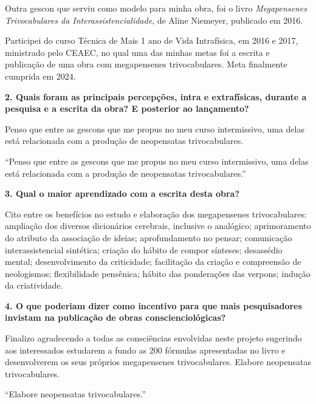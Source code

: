 \documentclass{gescons}
\begin{document}
\begin{multicols}{2}
Outra gescon que serviu como modelo  para minha obra, foi o livro \textit{Megapensenes Trivocabulares da Interassistencialidade}, de Aline Niemeyer, publicado em 2016.

Participei do curso Técnica de Mais 1 ano de Vida Intrafísica, em 2016 e 2017,  ministrado pelo CEAEC, no qual uma das minhas metas foi a escrita e publicação de uma obra com megapensenes trivocabulares. Meta finalmente cumprida em 2024.

\textbf{2.       Quais foram as principais percepções, intra e extrafísicas, durante a pesquisa e a escrita da obra? E posterior ao lançamento?}

Penso que entre as gescons que me propus no meu curso intermissivo, uma delas está relacionada com a produção de neopensatas trivocabulares. 

\begin{pullquote}
    ``Penso que entre as gescons que me propus no meu curso intermissivo, uma delas está relacionada com a produção de neopensatas trivocabulares.''
\end{pullquote}

\textbf{3.       Qual o maior aprendizado com a escrita desta obra?}

Cito entre os benefícios no estudo e elaboração dos megapensenes trivocabulares: ampliação dos diversos dicionários cerebrais, inclusive o analógico; aprimoramento do atributo da associação de ideias; aprofundamento no pensar; comunicação interassistencial sintética; criação do hábito de compor sínteses; desassédio mental; desenvolvimento da criticidade; facilitação da criação e compreensão de neologismos; flexibilidade pensênica; hábito das ponderações das verpons; indução da criatividade.


\textbf{4.       O que poderiam dizer como incentivo para que mais pesquisadores invistam na publicação de obras conscienciológicas?}

Finalizo agradecendo a todas as consciências envolvidas neste projeto sugerindo aos interessados estudarem a fundo as 200 fórmulas apresentadas no livro e desenvolverem os seus próprios megapensenes trivocabulares. Elabore neopensatas trivocabulares.


\begin{pullquote}
``Elabore neopensatas trivocabulares.''
\end{pullquote}
    
    \end{multicols}
\end{document}
